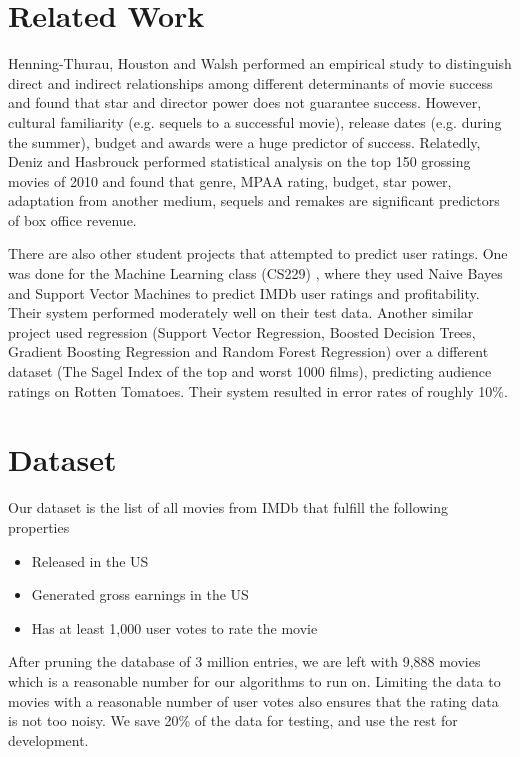 \documentclass[journal]{IEEEtran}
\begin{document}
\section{Related Work}
Henning-Thurau, Houston and Walsh \cite{marketing} performed an empirical study
to distinguish direct and indirect relationships among different determinants
of movie success and found that star and director power does not guarantee
success. However, cultural familiarity (e.g. sequels to a successful movie),
release dates (e.g. during the summer), budget and awards were a huge predictor
of success. Relatedly, Deniz and Hasbrouck \cite{greenlight} performed
statistical analysis on the top 150 grossing movies of 2010 and found that
genre, MPAA rating, budget, star power, adaptation from another medium, sequels
and remakes are significant predictors
of box office revenue. 
\\
\par There are also other student projects that attempted to predict user
ratings. One was done for the Machine Learning class (CS229) \cite{hitorflop},
where they used Naive Bayes and Support Vector Machines to predict IMDb user
ratings and profitability. Their system performed moderately well on their test
data. Another similar project \cite{cooper} used regression (Support Vector
Regression, Boosted Decision Trees, Gradient Boosting Regression and Random
Forest Regression) over a different dataset (The Sagel Index of the top and
worst 1000 films), predicting audience ratings on Rotten Tomatoes. Their system
resulted in error rates of roughly 10\%.

\section{Dataset}
Our dataset is the list of all movies from IMDb that fulfill the following properties
\begin{itemize}
	\item Released in the US
	\item Generated gross earnings in the US
	\item Has at least 1,000 user votes to rate the movie
\end{itemize}

\par After pruning the database of 3 million entries, we are left with 9,888
movies which is a reasonable number for our algorithms to run on. Limiting the
data to movies with a reasonable number of user votes also ensures that the
rating data is not too noisy. We save 20\% of the data for testing, and use the
rest for development.
\end{document}
